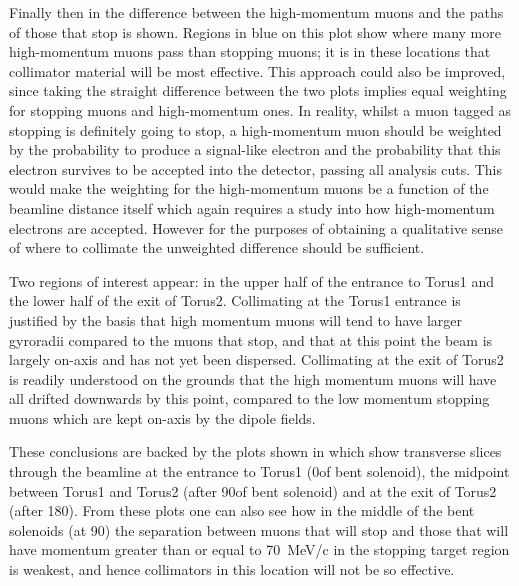 Finally then in  the difference between the high-momentum muons and the paths of those that stop is shown. 
Regions in blue on this plot show where many more high-momentum muons pass than stopping muons; it is in these locations that collimator material will be most effective.
This approach could also be improved, since taking the straight difference between the two plots implies equal weighting for stopping muons and high-momentum ones.
In reality, whilst a muon tagged as stopping is definitely going to stop, a high-momentum muon should be weighted by the probability to produce a signal-like electron and the probability that this electron survives to be accepted into the detector, passing all analysis cuts.
This would make the weighting for the high-momentum muons be a function of the beamline distance itself which again requires a study into how high-momentum electrons are accepted.
However for the purposes of obtaining a qualitative sense of where to collimate the unweighted difference should be sufficient.

Two regions of interest appear: in the upper half of the entrance to Torus1 and the lower half of the exit of Torus2.  
Collimating at the Torus1 entrance is justified by the basis that high momentum muons will tend to have larger gyroradii compared to the muons that stop, and that at this point the beam is largely on-axis and has not yet been dispersed.
Collimating at the exit of Torus2 is readily understood on the grounds that the high momentum muons will have all drifted downwards by this point, compared to the low momentum stopping muons which are kept on-axis by the dipole fields.

\FigOptimMuBeamCollimTransverseSep
These conclusions are backed by the plots shown in  which show transverse slices through the beamline at the entrance to Torus1 (0\degree of bent solenoid), the midpoint between Torus1 and Torus2 (after 90\degree of bent solenoid) and at the exit of Torus2 (after 180\degree).
From these plots one can also see how in the middle of the bent solenoids (at 90\degree) the separation between muons that will stop and those that will have momentum greater than or equal to 70~MeV/c in the stopping target region is weakest, and hence collimators in this location will not be so effective.

\FigOptimMuBeamCollimTorusOne
\FigOptimMuBeamCollimTorusTwoFraction
